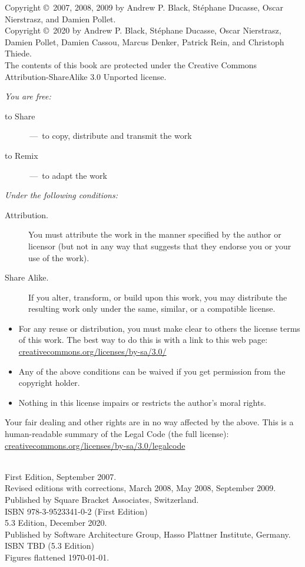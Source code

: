 \documentclass[a4paper,10pt,twoside]{book}
\begin{document}
\begin{footnotesize}
\setlength{\parindent}{0pt}
Copyright \copyright~2007, 2008, 2009 by Andrew P. Black, St\'ephane Ducasse, Oscar Nierstrasz, and Damien Pollet.\\
Copyright \copyright~2020 by Andrew P. Black, St\'ephane Ducasse, Oscar Nierstrasz, Damien Pollet, Damien Cassou, Marcus Denker, Patrick Rein, and Christoph Thiede.\\[1cm]

The contents of this book are protected under the Creative Commons Attribution-ShareAlike 3.0 Unported license.

\emph{You are free:}
\begin{description}
  \item[to Share] \,---\, to copy, distribute and transmit the work
  \item[to Remix] \,---\, to adapt the work
\end{description}
\emph{Under the following conditions:}
\begin{description}
  \item[Attribution.] You must attribute the work in the manner specified by the author or licensor (but not in any way that suggests that they endorse you or your use of the work).
  \item[Share Alike.] If you alter, transform, or build upon this work, you may distribute the resulting work only under the same, similar, or a compatible license.
\end{description}
\begin{itemize}
  \item For any reuse or distribution, you must make clear to others the license terms of this work. The best way to do this is with a link to this web page:
  \url{creativecommons.org/licenses/by-sa/3.0/}
  \item Any of the above conditions can be waived if you get permission from the copyright holder.
  \item Nothing in this license impairs or restricts the author's moral rights.
\end{itemize}
\quad
\parbox{\textwidth-2cm-1em}{
	Your fair dealing and other rights are in no way affected by the above.
	This is a human-readable summary of the Legal Code (the full license):\\
	\url{creativecommons.org/licenses/by-sa/3.0/legalcode}}\\[1cm]
First Edition, September 2007.\\
Revised editions with corrections, March 2008, May 2008, September 2009.\\
Published by Square Bracket Associates, Switzerland. \sba\\
ISBN 978-3-9523341-0-2 (First Edition)\\

5.3 Edition, December 2020.\\
Published by Software Architecture Group, Hasso Plattner Institute, Germany. \hpiswa\\
ISBN TBD (5.3 Edition)\\

Figures flattened \today.
\end{footnotesize}
\end{document}
